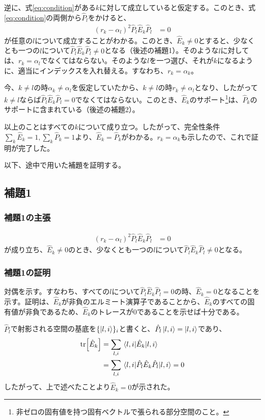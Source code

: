 \documentclass[uplatex,dvipdfmx, a4j]{jsarticle}
\newcommand{\ope}[1]{\hat{#1}}
\newcommand{\proj}{\ope{P}}
\begin{document}
逆に、式\eqref{eq:condition}がある$k$に対して成立していると仮定する。このとき、式\eqref{eq:condition}の両側から$\proj_l$をかけると、
\begin{align}
	(r_k-\alpha_l)^2 \proj_l\ope{E}_k\proj_l &= 0
\end{align}
が任意の$l$について成立することがわかる。このとき、$\ope{E}_k\neq 0$とすると、少なくとも一つの$l$について$\proj_l\ope{E}_k\proj_l\neq 0$となる（後述の補題1）。そのような$l$に対しては、$r_k = \alpha_l$でなくてはならない。そのような$l$を一つ選び、それが$k$になるように、適当にインデックスを入れ替える。すなわち、$r_k = \alpha_k$。

今、$k\neq l$の時$\alpha_k \neq \alpha_l$を仮定していたから、$k\neq l$の時$r_k \neq \alpha_l$となり、したがって$k\neq l$ならば$\proj_l\ope{E}_k\proj_l = 0$でなくてはならない。このとき、$\ope{E}_k$のサポート\footnote{非ゼロの固有値を持つ固有ベクトルで張られる部分空間のこと。}は、$\proj_k$のサポートに含まれている（後述の補題2）。

以上のことはすべての$k$について成り立つ。したがって、完全性条件$\sum_k\ope{E}_k = 1, \sum_k\proj_k = 1$より、$\ope{E}_k = \proj_k$がわかる。$r_k = \alpha_k$も示したので、これで証明が完了した。

以下、途中で用いた補題を証明する。
\subsection{補題1}
\subsubsection{補題1の主張}
\begin{align}
	(r_k-\alpha_l)^2 \proj_l\ope{E}_k\proj_l &= 0
\end{align}
が成り立ち、$\ope{E}_k\neq 0$のとき、少なくとも一つの$l$について$\proj_l\ope{E}_k\proj_l\neq 0$となる。
\subsubsection{補題1の証明}
対偶を示す。すなわち、すべての$l$について$\proj_l\ope{E}_k\proj_l = 0$の時、$\ope{E}_k = 0$となることを示す。証明は、$\ope{E}_k$が非負のエルミート演算子であることから、$\ope{E}_k$のすべての固有値が非負であるため、$\ope{E}_k$のトレースが0であることを示せば十分である。

$\proj_l$で射影される空間の基底を$\{\ket{l,i}\}_i$と書くと、$\proj_l\ket{l,i} = \ket{l,i}$であり、
\begin{align}
	\tr[\ope{E}_k] &= \sum_{l,i} \matrixel*{l,i}{\ope{E}_k}{l,i} \\
	&= \sum_{l,i} \matrixel*{l,i}{\proj_l\ope{E}_k\proj_l}{l,i} = 0
\end{align}
したがって、上で述べたことより$\ope{E}_k=0$が示された。
\end{document}
